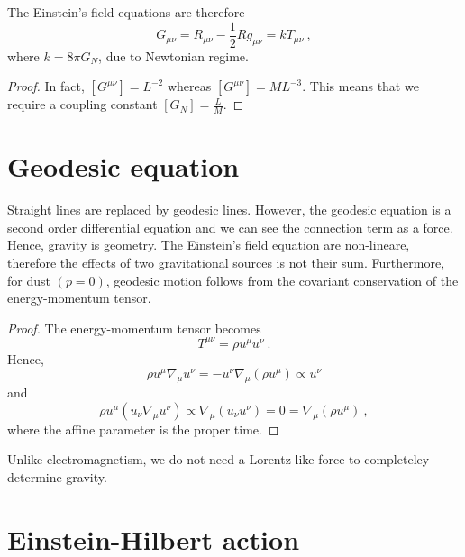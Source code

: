     The Einstein's field equations are therefore
    \begin{equation}\label{fieldeq}
        G_{\mu\nu} = R_{\mu\nu} - \frac{1}{2} R g_{\mu\nu} = k T_{\mu\nu} ~,
    \end{equation}
    where $k = 8 \pi G_N$, due to Newtonian regime.
    \begin{proof}
        In fact, $[G^{\mu\nu}] = L^{-2}$ whereas $[G^{\mu\nu}] = M L^{-3}$. This means that we require a coupling constant $[G_N] = \frac{L}{M}$. 
    \end{proof}

\section{Geodesic equation} 

    Straight lines are replaced by geodesic lines. However, the geodesic equation is a second order differential equation and we can see the connection term as a force. Hence, gravity is geometry. The Einstein's field equation are non-lineare, therefore the effects of two gravitational sources is not their sum. Furthermore, for dust $(p = 0)$, geodesic motion follows from the covariant conservation of the energy-momentum tensor. 
    \begin{proof}
        The energy-momentum tensor becomes
        \begin{equation*}
            T^{\mu\nu} = \rho u^\mu u^\nu ~.
        \end{equation*}
        Hence, 
        \begin{equation*}
            \rho u^\mu \nabla_\mu u^\nu = - u^\nu \nabla_\mu (\rho u^\mu ) \propto u^\nu 
        \end{equation*}
        and 
        \begin{equation*}
            \rho u^\mu (u_\nu \nabla_\mu u^\nu) \propto \nabla_\mu (u_\nu u^\nu) = 0 = \nabla_\mu (\rho u^\mu) ~,
        \end{equation*}
        where the affine parameter is the proper time.
    \end{proof}

    Unlike electromagnetism, we do not need a Lorentz-like force to completeley determine gravity. 

\section{Einstein-Hilbert action} 